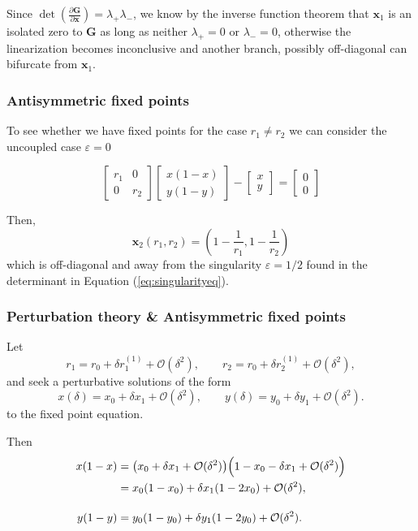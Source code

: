 Since $ {\det}\left(\frac{\partial \symbf{G}}{\partial \symbf{x}}\right) = \lambda_+\lambda_-$, we know by the inverse function theorem
that $\symbf{x}_1$ is an isolated zero to $\symbf{G}$ as long as neither $\lambda_+ = 0$ or $\lambda_- = 0$, otherwise the 
linearization becomes inconclusive and another branch, possibly off-diagonal can bifurcate from $\symbf{x}_1$. 

\subsubsection{Antisymmetric fixed points}
To see whether we have fixed points for the case $r_1\neq r_2$ we can consider the uncoupled case $\varepsilon = 0$



\begin{equation}
	\begin{bmatrix}
		r_1 & 0 \\
		0 & r_2
	\end{bmatrix}
	\begin{bmatrix}
		x(1-x)\\y(1-y)
	\end{bmatrix}
	-
	\begin{bmatrix}
		x\\y
	\end{bmatrix}
	=
	\begin{bmatrix}
		0\\0
	\end{bmatrix}
\end{equation}

Then, 
\begin{equation}
	\symbf{x}_2(r_1, r_2) = \left(1 - \frac{1}{r_1}, 1 - \frac{1}{r_2}\right)
\end{equation}
which is off-diagonal and away from the singularity $\varepsilon = 1/2$ found in the determinant in Equation (\ref{eq:singularityeq}). 
\subsubsection{Perturbation theory \& Antisymmetric fixed points}
Let
\[
r_1=r_0+\delta r_1^{(1)}+\mathcal O(\delta^2), \qquad
r_2=r_0+\delta r_2^{(1)}+\mathcal O(\delta^2),
\]
and seek a perturbative solutions of the form
\[
x(\delta)=x_0+\delta x_1+\mathcal O(\delta^2), \qquad
y(\delta)=y_0+\delta y_1+\mathcal O(\delta^2).
\]
to the fixed point equation.

Then
\begin{align}
x(1-x)
&=
\bigl(x_0+\delta x_1+\mathcal O(\delta^2)\bigr)
\Bigl(1-x_0-\delta x_1+\mathcal O(\delta^2)\Bigr) \notag\\
&=
x_0(1-x_0)+\delta x_1(1-2x_0)+\mathcal O(\delta^2),
\\[1em]
y(1-y)
&=
y_0(1-y_0)+\delta y_1(1-2y_0)+\mathcal O(\delta^2).
\end{align}

